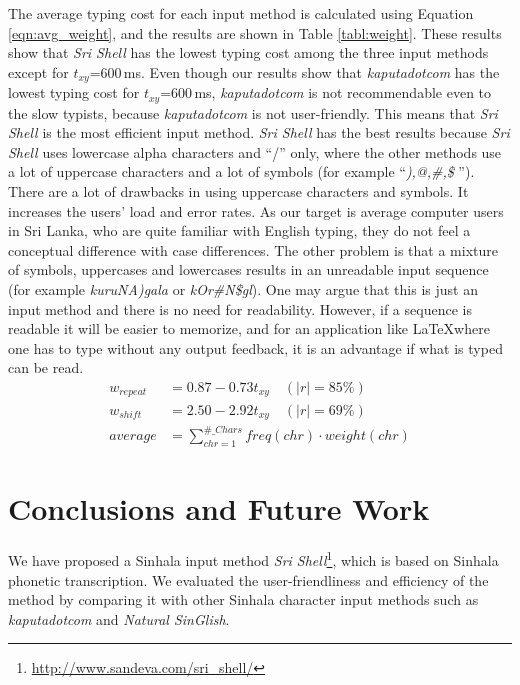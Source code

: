 \documentclass[english]{jnlp_1.3e}
\begin{document}
The average typing cost for each input method is calculated using Equation \ref{eqn:avg_weight}, and the results are shown in Table \ref{tabl:weight}.
These results show that {\it Sri Shell} has the lowest typing cost among the three input methods except for $t_{xy}$=600\,ms. Even though our results show that {\it kaputadotcom} has the lowest typing cost for $t_{xy}$=600\,ms, {\it kaputadotcom} is not recommendable even to the slow typists, because {\it kaputadotcom} is not user-friendly.
This means that {\it Sri Shell} is the most efficient input method. 
{\it Sri Shell} has the best results because {\it Sri Shell} uses lowercase alpha characters and ``/'' only, 
where the other methods use a lot of uppercase characters and a lot of symbols (for example ``{\it ),@,\#,\$} '').
There are a lot of  drawbacks  in using uppercase characters and symbols. 
It increases the users' load and error rates. 
As our target  is average  computer users in Sri Lanka, who are quite familiar with English typing, they do not feel a conceptual difference  with  case differences.
The other problem is  that  a mixture of symbols, uppercases and lowercases results in an unreadable input sequence (for example {\it kuruNA)gala} or {\it kOr\#N\$gl}).
One may argue that this is just an input method and there is no  need for readability. 
 However, if a sequence is  readable it will be easier to memorize, and for an application like \LaTeX  where one has to type without any output feedback,
it is an advantage if what is typed can be read.
\begin{align}
 w_{\mathit{repeat}}&=0.87-0.73t_{xy}	\quad (|r|=85\%)\label{eqn:w_repeat} \\
 w_{\mathit{shift}}&=2.50-2.92t_{xy}	\quad (|r|=69\%)\label{eqn:w_shift}\\
 \mathit{average}&=\sum _{\mathit{chr}= 1} ^{\#\_\mathit{Chars}} \mathit{freq}(\mathit{chr})\cdot \mathit{weight}(\mathit{chr}) \label{eqn:avg_weight}
\end{align}




\section{Conclusions and Future Work}
\label{conclusions}

We have proposed a Sinhala input method {\it Sri Shell}\footnote{\url{http://www.sandeva.com/sri_shell/}}, which is based on Sinhala phonetic transcription.
We evaluated the user-friendliness and efficiency of the method by comparing it with other Sinhala character input methods such as {\it kaputadotcom} and {\it Natural SinGlish}. 
\end{document}
